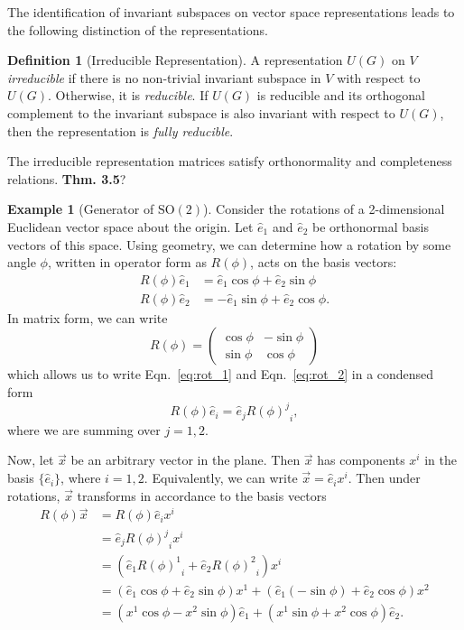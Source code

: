 \documentclass[12pt]{report}
\newcommand{\ehat}{\hat{e}}
\newcommand{\mat}[3]{{{#1}^#2}_#3}
\newcommand{\sotwo}{\textrm{SO}{(2)}}
\theoremstyle{definition}
\newtheorem{definition}{Definition}[chapter]
\newtheorem{example}{Example}[chapter]
\begin{document}
The identification of invariant subspaces on vector space representations leads to the following distinction of the representations.
\begin{definition}[Irreducible Representation]
    A representation $U(G)$ on $V$ \textit{irreducible} if there is no non-trivial invariant subspace in $V$ with respect to $U(G)$. Otherwise, it is \textit{reducible}. If $U(G)$ is reducible and its orthogonal complement to the invariant subspace is also invariant with respect to $U(G)$, then the representation is \textit{fully reducible}.
    
\end{definition}

The irreducible representation matrices satisfy orthonormality and completeness relations.\textbf{ Thm. 3.5}?

\begin{example}[Generator of $\sotwo$]
    Consider the rotations of a 2-dimensional Euclidean vector space about the origin. Let $\ehat_1$ and $\ehat_2$ be orthonormal basis vectors of this space. Using geometry, we can determine how a rotation by some angle $\phi$, written in operator form as $R(\phi)$, acts on the basis vectors:
    \begin{align}
        R(\phi)\ehat_1 &= \ehat_1\cos\phi + \ehat_2\sin\phi \label{eq:rot_1}\\
        R(\phi)\ehat_2 &= -\ehat_1\sin\phi + \ehat_2\cos\phi.\label{eq:rot_2}
    \end{align}
    In matrix form, we can write
    \begin{equation}
        R(\phi) = 
        \begin{pmatrix}
            \cos\phi & -\sin\phi \\
            \sin\phi & \cos\phi
        \end{pmatrix}
    \end{equation}
    which allows us to write Eqn.~\ref{eq:rot_1} and Eqn.~\ref{eq:rot_2} in a condensed form
    \begin{equation}
        R(\phi)\ehat_i = \ehat_j{{R(\phi)}^j}_i,
    \end{equation}
    where we are summing over $j=1,2$.

    Now, let $\vec{x}$ be an arbitrary vector in the plane. Then $\vec{x}$ has components $x^i$ in the basis $\{\ehat_i\}$, where $i=1,2$. Equivalently, we can write $\vec{x}=\ehat_i x^i$. Then under rotations, $\vec{x}$ transforms in accordance to the basis vectors
    \begin{align}
        R(\phi)\vec{x} &= R(\phi)\ehat_i x^i \label{eq:rot_vec} \\
        &= \ehat_j{{R(\phi)}^j}_i x^i \nonumber \\
        &= \left( \ehat_1\mat{R(\phi)}{1}{i} + \ehat_2\mat{R(\phi)}{2}{i} \right)x^i \nonumber \\
        &= \left( \ehat_1\cos\phi + \ehat_2\sin\phi \right) x^1 + \left( \ehat_1(-\sin\phi) + \ehat_2\cos\phi \right) x^2 \nonumber \\
        &= \left( x^1\cos\phi - x^2\sin\phi \right)\ehat_1 + \left( x^1\sin\phi + x^2\cos\phi \right)\ehat_2.  \nonumber
    \end{align}


\end{example}
\end{document}
